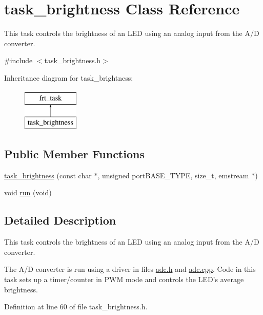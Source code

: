 \hypertarget{classtask__brightness}{\section{task\+\_\+brightness Class Reference}
\label{classtask__brightness}
}


This task controls the brightness of an L\+E\+D using an analog input from the A/\+D converter.  




{\ttfamily \#include $<$task\+\_\+brightness.\+h$>$}

Inheritance diagram for task\+\_\+brightness\+:\begin{figure}[H]
\begin{center}
\leavevmode
\includegraphics[height=2.000000cm]{classtask__brightness}
\end{center}
\end{figure}
\subsection*{Public Member Functions}
\begin{DoxyCompactItemize}
\item 
\hyperlink{classtask__brightness_a5802baf3a0c9fe53ccbce8966d1fad47}{task\+\_\+brightness} (const char $\ast$, unsigned port\+B\+A\+S\+E\+\_\+\+T\+Y\+P\+E, size\+\_\+t, emstream $\ast$)
\item 
void \hyperlink{classtask__brightness_a615beac07a99f0856f048a46fd9a3898}{run} (void)
\end{DoxyCompactItemize}


\subsection{Detailed Description}
This task controls the brightness of an L\+E\+D using an analog input from the A/\+D converter. 

The A/\+D converter is run using a driver in files {\ttfamily \hyperlink{adc_8h}{adc.\+h}} and {\ttfamily \hyperlink{adc_8cpp}{adc.\+cpp}}. Code in this task sets up a timer/counter in P\+W\+M mode and controls the L\+E\+D's average brightness. 

Definition at line 60 of file task\+\_\+brightness.\+h.



